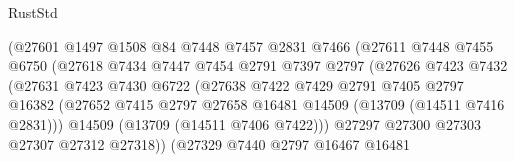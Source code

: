 \begin{lexlean}{RustStd}
\begin{coremodule}
                                  (@27601
                                    @1497
                                    @1508
                                    @84
                                    @7448
                                    @7457
                                    @2831
                                    @7466
                                    (@27611
                                      @7448
                                      @7455
                                      @6750
                                      (@27618
                                        @7434
                                        @7447
                                        @7454
                                        @2791
                                        @7397
                                        @2797
                                        (@27626
                                          @7423
                                          @7432
                                          (@27631
                                            @7423
                                            @7430
                                            @6722
                                            (@27638
                                              @7422
                                              @7429
                                              @2791
                                              @7405
                                              @2797
                                              @16382
                                              (@27652
                                                @7415
                                                @2797
                                                @27658
                                                @16481
                                                @14509
                                                (@13709 (@14511 @7416 @2831)))
                                              @14509
                                              (@13709 (@14511 @7406 @7422)))
                                            @27297
                                            @27300
                                            @27303
                                            @27307
                                            @27312
                                            @27318))
                                        (@27329
                                          @7440
                                          @2797
                                          @16467
                                          @16481

\end{coremodule}
\end{lexlean}
